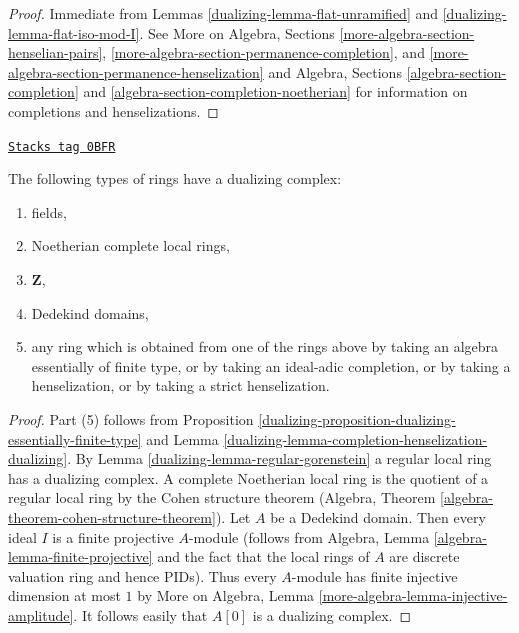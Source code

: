 \begin{proof}

Immediate from Lemmas \ref{dualizing-lemma-flat-unramified} and
\ref{dualizing-lemma-flat-iso-mod-I}.
See More on Algebra, Sections \ref{more-algebra-section-henselian-pairs},
\ref{more-algebra-section-permanence-completion}, and
\ref{more-algebra-section-permanence-henselization} and
Algebra, Sections \ref{algebra-section-completion} and
\ref{algebra-section-completion-noetherian}
for information on completions and henselizations.
\end{proof}

\begin{lemma}
\label{dualizing-lemma-ubiquity-dualizing}
\href{https://stacks.math.columbia.edu/tag/0BFR}{\texttt{Stacks tag 0BFR}}

The following types of rings have a dualizing complex:
\begin{enumerate}
\item fields,
\item Noetherian complete local rings,
\item $\mathbf{Z}$,
\item Dedekind domains,
\item any ring which is obtained from one of the rings above by
taking an algebra essentially of finite type, or by taking an
ideal-adic completion, or by taking a henselization,
or by taking a strict henselization.
\end{enumerate}
\end{lemma}

\begin{proof}

Part (5) follows from Proposition
\ref{dualizing-proposition-dualizing-essentially-finite-type}
and Lemma \ref{dualizing-lemma-completion-henselization-dualizing}.
By Lemma \ref{dualizing-lemma-regular-gorenstein} a regular local ring has a
dualizing complex.
A complete Noetherian local ring is the quotient of a regular
local ring by the Cohen structure theorem
(Algebra, Theorem \ref{algebra-theorem-cohen-structure-theorem}).
Let $A$ be a Dedekind domain. Then every ideal $I$ is a finite
projective $A$-module (follows from
Algebra, Lemma \ref{algebra-lemma-finite-projective}
and the fact that the local rings of $A$ are discrete valuation ring
and hence PIDs). Thus every $A$-module has finite injective dimension
at most $1$ by
More on Algebra, Lemma \ref{more-algebra-lemma-injective-amplitude}.
It follows easily that $A[0]$ is a dualizing complex.
\end{proof}

